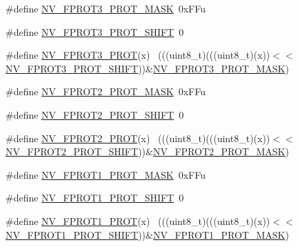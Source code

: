 \begin{DoxyCompactItemize}
\item 
\#define \hyperlink{group___n_v___register___masks_ga1a2ecc3ba1f6ae4c2db7fcaa8f369b34}{N\+V\+\_\+\+F\+P\+R\+O\+T3\+\_\+\+P\+R\+O\+T\+\_\+\+M\+A\+SK}~0x\+F\+Fu
\item 
\#define \hyperlink{group___n_v___register___masks_gaee74e224c0572f7618f28c11d921b6e3}{N\+V\+\_\+\+F\+P\+R\+O\+T3\+\_\+\+P\+R\+O\+T\+\_\+\+S\+H\+I\+FT}~0
\item 
\#define \hyperlink{group___n_v___register___masks_ga480ba67bcc94573ed72a579f378d99a1}{N\+V\+\_\+\+F\+P\+R\+O\+T3\+\_\+\+P\+R\+OT}(x)                                            ~(((uint8\+\_\+t)(((uint8\+\_\+t)(x))$<$$<$\hyperlink{group___n_v___register___masks_gaee74e224c0572f7618f28c11d921b6e3}{N\+V\+\_\+\+F\+P\+R\+O\+T3\+\_\+\+P\+R\+O\+T\+\_\+\+S\+H\+I\+FT}))\&\hyperlink{group___n_v___register___masks_ga1a2ecc3ba1f6ae4c2db7fcaa8f369b34}{N\+V\+\_\+\+F\+P\+R\+O\+T3\+\_\+\+P\+R\+O\+T\+\_\+\+M\+A\+SK})
\item 
\#define \hyperlink{group___n_v___register___masks_ga99b7ccf89e4d3cc80d0317086202de0f}{N\+V\+\_\+\+F\+P\+R\+O\+T2\+\_\+\+P\+R\+O\+T\+\_\+\+M\+A\+SK}~0x\+F\+Fu
\item 
\#define \hyperlink{group___n_v___register___masks_ga50f9336b86839704ca20297b040c3ca5}{N\+V\+\_\+\+F\+P\+R\+O\+T2\+\_\+\+P\+R\+O\+T\+\_\+\+S\+H\+I\+FT}~0
\item 
\#define \hyperlink{group___n_v___register___masks_ga0a02b2f351b6b36febb00f4ac3604a9c}{N\+V\+\_\+\+F\+P\+R\+O\+T2\+\_\+\+P\+R\+OT}(x)                                            ~(((uint8\+\_\+t)(((uint8\+\_\+t)(x))$<$$<$\hyperlink{group___n_v___register___masks_ga50f9336b86839704ca20297b040c3ca5}{N\+V\+\_\+\+F\+P\+R\+O\+T2\+\_\+\+P\+R\+O\+T\+\_\+\+S\+H\+I\+FT}))\&\hyperlink{group___n_v___register___masks_ga99b7ccf89e4d3cc80d0317086202de0f}{N\+V\+\_\+\+F\+P\+R\+O\+T2\+\_\+\+P\+R\+O\+T\+\_\+\+M\+A\+SK})
\item 
\#define \hyperlink{group___n_v___register___masks_ga4ca39bad3b57769cb423f1616c985e38}{N\+V\+\_\+\+F\+P\+R\+O\+T1\+\_\+\+P\+R\+O\+T\+\_\+\+M\+A\+SK}~0x\+F\+Fu
\item 
\#define \hyperlink{group___n_v___register___masks_ga06d0cb2797f243b77d60cfecedfc9f86}{N\+V\+\_\+\+F\+P\+R\+O\+T1\+\_\+\+P\+R\+O\+T\+\_\+\+S\+H\+I\+FT}~0
\item 
\#define \hyperlink{group___n_v___register___masks_gaf206463f78b039135d71cfd13dc43193}{N\+V\+\_\+\+F\+P\+R\+O\+T1\+\_\+\+P\+R\+OT}(x)                                            ~(((uint8\+\_\+t)(((uint8\+\_\+t)(x))$<$$<$\hyperlink{group___n_v___register___masks_ga06d0cb2797f243b77d60cfecedfc9f86}{N\+V\+\_\+\+F\+P\+R\+O\+T1\+\_\+\+P\+R\+O\+T\+\_\+\+S\+H\+I\+FT}))\&\hyperlink{group___n_v___register___masks_ga4ca39bad3b57769cb423f1616c985e38}{N\+V\+\_\+\+F\+P\+R\+O\+T1\+\_\+\+P\+R\+O\+T\+\_\+\+M\+A\+SK})
$$
\end{DoxyCompactItemize}
